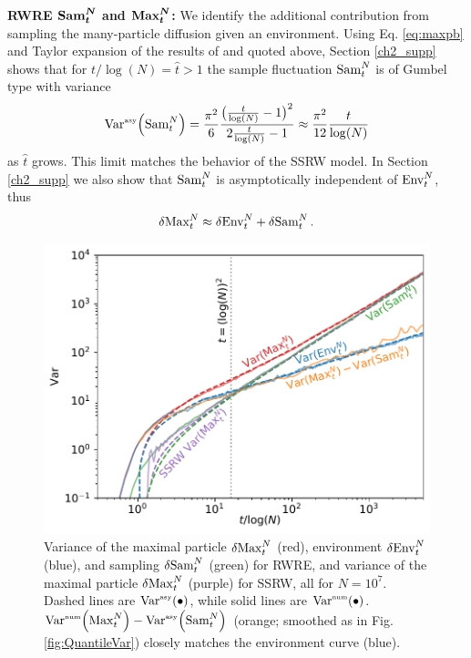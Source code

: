 \noindent\textbf{RWRE $\boldsymbol{\mathrm{Sam}^{N}_t}$ and $\boldsymbol{\mathrm{Max}^{N}_t}$:}
We identify the additional contribution from sampling the many-particle diffusion given an environment.
Using Eq. \eqref{eq:maxpb} and Taylor expansion of the results of \cite{barraquand_random-walk_2017} and \cite{barraquand_moderate_2020} quoted above,  Section \ref{ch2_supp} shows that for $t/\log(N)=\hat{t}>1$ the sample fluctuation $\mathrm{Sam}^{N}_t$ is of Gumbel type with variance
%
\begin{equation}\label{eq:varnst}
\mathrm{Var}^{\textrm{\tiny{asy}}}\!\left(\mathrm{Sam}^{N}_t\right) = \frac{\pi^2}{6} \frac{\big(\frac{t}{\log(N)} -1\big)^2}{2\frac{t}{\log(N)} -1}\approx \frac{\pi^2}{12} \frac{t}{\log(N)}
\end{equation}
as $\hat{t}$ grows. This limit matches the behavior of the SSRW model. In Section \ref{ch2_supp} we also show that $\mathrm{Sam}^{N}_t$ is asymptotically independent of $\mathrm{Env}^{N}_t$, thus
\begin{equation}\label{eq:varadd}
\var{\mathrm{Max}^{N}_t} \approx \var{\mathrm{Env}^{N}_t} + \var{\mathrm{Sam}^{N}_t}.
\end{equation}

\begin{figure}[h]
\begin{center}
\includegraphics[width=0.9\columnwidth]{Figures/MaxQuantComp.pdf}
\caption{Variance of the maximal particle $\var{\mathrm{Max}^{N}_t}$ (red), environment $\var{\mathrm{Env}^{N}_t}$ (blue), and sampling $\var{\mathrm{Sam}^{N}_t}$ (green) for RWRE, and variance of the maximal particle  $\var{\mathrm{Max}^{N}_t}$ (purple) for SSRW, all for $N=10^7$. Dashed lines are $\mathrm{Var}^{\textrm{\tiny{asy}}}\!\left(\bullet\right)$, while solid lines are $\mathrm{Var}^{\textrm{\tiny{num}}}\!\left(\bullet\right)$. $\mathrm{Var}^{\textrm{\tiny{num}}}\!\left(\mathrm{Max}^{N}_t\right) - \mathrm{Var}^{\textrm{\tiny{asy}}}\!\left(\mathrm{Sam}^{N}_t\right)$ (orange; smoothed as in Fig. \ref{fig:QuantileVar}) closely matches the environment curve (blue).}
\label{fig:RWREAssembly}
\end{center}
\end{figure}

